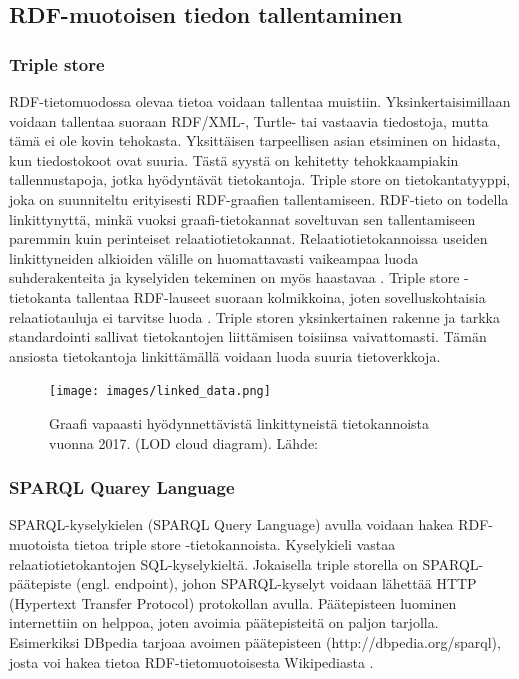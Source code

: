 \documentclass[finnish, 12pt, a4paper, elec, utf8, pdfa, online]{aaltothesis}
\begin{document}
{\subsection{RDF-muotoisen tiedon tallentaminen}


\subsubsection{Triple store}
RDF-tietomuodossa olevaa tietoa voidaan tallentaa muistiin. Yksinkertaisimillaan voidaan tallentaa suoraan RDF/XML-, Turtle- tai vastaavia tiedostoja, mutta tämä ei ole kovin tehokasta. Yksittäisen tarpeellisen asian etsiminen on hidasta, kun tiedostokoot ovat suuria. Tästä syystä on kehitetty tehokkaampiakin tallennustapoja, jotka hyödyntävät tietokantoja. Triple store on tietokantatyyppi, joka on suunniteltu erityisesti RDF-graafien tallentamiseen. RDF-tieto on todella linkittynyttä, minkä vuoksi graafi-tietokannat soveltuvan sen tallentamiseen paremmin kuin perinteiset relaatiotietokannat. Relaatiotietokannoissa useiden linkittyneiden alkioiden välille on huomattavasti vaikeampaa luoda suhderakenteita ja kyselyiden tekeminen on myös haastavaa \cite{triplestore2}. Triple store -tietokanta tallentaa RDF-lauseet suoraan kolmikkoina, joten sovelluskohtaisia relaatiotauluja ei tarvitse luoda \cite{triplestore}. Triple storen yksinkertainen rakenne ja tarkka standardointi sallivat tietokantojen liittämisen toisiinsa vaivattomasti. Tämän ansiosta tietokantoja linkittämällä voidaan luoda suuria tietoverkkoja.


\begin{figure}[htb]
\centering
\texttt{[image: images/linked\_data.png]}
\caption{Graafi vapaasti hyödynnettävistä linkittyneistä tietokannoista vuonna 2017. (LOD cloud diagram). Lähde: \cite{LOD_cloud} \label{images/linked_data}}
\end{figure}
\clearpage

\subsubsection{SPARQL Quarey Language}
SPARQL-kyselykielen (SPARQL Query Language) avulla voidaan hakea RDF-muotoista tietoa triple store -tietokannoista. Kyselykieli vastaa relaatiotietokantojen SQL-kyselykieltä. Jokaisella triple storella on SPARQL-päätepiste (engl. endpoint), johon SPARQL-kyselyt voidaan lähettää HTTP (Hypertext Transfer Protocol) protokollan avulla. Päätepisteen luominen internettiin on helppoa, joten avoimia päätepisteitä on paljon tarjolla. Esimerkiksi DBpedia tarjoaa avoimen päätepisteen (http://dbpedia.org/sparql), josta voi hakea tietoa RDF-tietomuotoisesta Wikipediasta \cite{Antoniou}.

}
\end{document}
